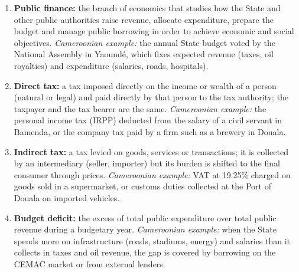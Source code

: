 \documentclass[11pt]{article}
\begin{document}
\begin{corrige}
\begin{enumerate}
\item \textbf{Public finance:} the branch of economics that studies how the State and other public authorities raise revenue, allocate expenditure, prepare the budget and manage public borrowing in order to achieve economic and social objectives. \emph{Cameroonian example:} the annual State budget voted by the National Assembly in Yaoundé, which fixes expected revenue (taxes, oil royalties) and expenditure (salaries, roads, hospitals).
\item \textbf{Direct tax:} a tax imposed directly on the income or wealth of a person (natural or legal) and paid directly by that person to the tax authority; the taxpayer and the tax bearer are the same. \emph{Cameroonian example:} the personal income tax (IRPP) deducted from the salary of a civil servant in Bamenda, or the company tax paid by a firm such as a brewery in Douala.
\item \textbf{Indirect tax:} a tax levied on goods, services or transactions; it is collected by an intermediary (seller, importer) but its burden is shifted to the final consumer through prices. \emph{Cameroonian example:} VAT at 19.25\% charged on goods sold in a supermarket, or customs duties collected at the Port of Douala on imported vehicles.
\item \textbf{Budget deficit:} the excess of total public expenditure over total public revenue during a budgetary year. \emph{Cameroonian example:} when the State spends more on infrastructure (roads, stadiums, energy) and salaries than it collects in taxes and oil revenue, the gap is covered by borrowing on the CEMAC market or from external lenders.
\end{enumerate}
\end{corrige}
\end{document}
